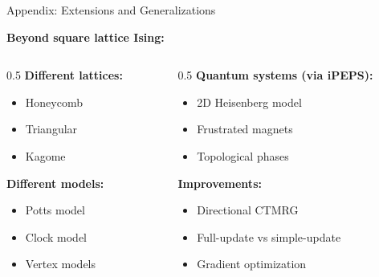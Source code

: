 \documentclass[aspectratio=169, 11pt]{beamer}
\begin{document}
\begin{frame}{Appendix: Extensions and Generalizations}
    
    \textbf{Beyond square lattice Ising:}
    
    \vspace{0.3cm}
    
    \begin{columns}
        \begin{column}{0.5\textwidth}
            \textbf{Different lattices:}
            \begin{itemize}
                \item Honeycomb
                \item Triangular
                \item Kagome
            \end{itemize}
            
            \vspace{0.3cm}
            
            \textbf{Different models:}
            \begin{itemize}
                \item Potts model
                \item Clock model
                \item Vertex models
            \end{itemize}
        \end{column}
        
        \begin{column}{0.5\textwidth}
            \textbf{Quantum systems (via iPEPS):}
            \begin{itemize}
                \item 2D Heisenberg model
                \item Frustrated magnets
                \item Topological phases
            \end{itemize}
            
            \vspace{0.3cm}
            
            \textbf{Improvements:}
            \begin{itemize}
                \item Directional CTMRG
                \item Full-update vs simple-update
                \item Gradient optimization
            \end{itemize}
        \end{column}
    \end{columns}
\end{frame}
\end{document}
